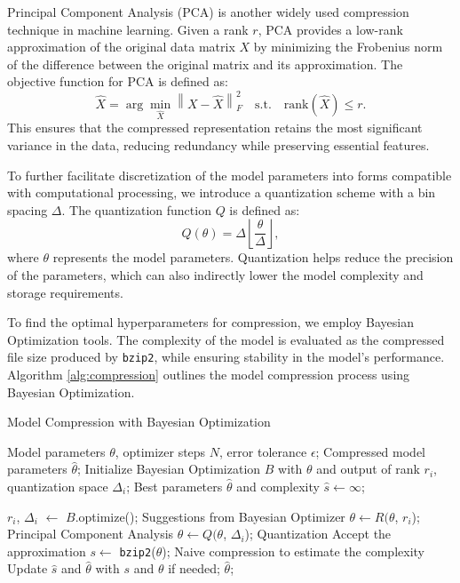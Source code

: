 \documentclass{article}
\begin{document}
Principal Component Analysis (PCA) is another widely used compression technique in machine learning. Given a rank $r$, PCA provides a low-rank approximation of the original data matrix $X$ by minimizing the Frobenius norm of the difference between the original matrix and its approximation. The objective function for PCA is defined as:
$$
\hat{X} = \arg\min_{\hat{X}} \left\| X - \hat{X} \right\|_F^2 \quad \text{s.t.} \quad \text{rank}(\hat{X}) \le r.
$$
This ensures that the compressed representation retains the most significant variance in the data, reducing redundancy while preserving essential features.

To further facilitate discretization of the model parameters into forms compatible with computational processing, we introduce a quantization scheme with a bin spacing $\Delta$. The quantization function $Q$ is defined as:
$$
Q(\theta) = \Delta \left\lfloor \frac{\theta}{\Delta} \right\rfloor,
$$
where $\theta$ represents the model parameters. Quantization helps reduce the precision of the parameters, which can also indirectly lower the model complexity and storage requirements.

To find the optimal hyperparameters for compression, we employ Bayesian Optimization tools. The complexity of the model is evaluated as the compressed file size produced by \texttt{bzip2}, while ensuring stability in the model's performance. Algorithm \ref{alg:compression} outlines the model compression process using Bayesian Optimization.

\begin{algorithm}[!ht]
    \renewcommand{\algorithmicrequire}{\textbf{Input:}}
    \renewcommand{\algorithmicensure}{\textbf{Output:}}
    \caption{Model Compression with Bayesian Optimization}
    \label{alg:compression}
    \begin{algorithmic}[1]
        \Require Model parameters $\theta$, optimizer steps $N$, error tolerance $\epsilon$;
        \Ensure Compressed model parameters $\hat{\theta}$;
        \State Initialize Bayesian Optimization $B$ with $\theta$ and output of rank $r_i$, quantization space $\Delta_i$;
        \State Best parameters $\hat{\theta}$ and complexity $\hat{s} \leftarrow \infty$;

        \State $r_i$, $\Delta_i$ $\leftarrow$ $B$.optimize();
        \Comment Suggestions from Bayesian Optimizer
        \State $\theta \leftarrow R(\theta$, $r_i$);
        \Comment Principal Component Analysis
        \State $\theta \leftarrow Q(\theta$, $\Delta_i$);
        \Comment Quantization
        \Comment Accept the approximation
        \State $s \leftarrow$ \texttt{bzip2}($\theta$);
        \Comment Naive compression to estimate the complexity
        \State Update $\hat{s}$ and $\hat{\theta}$ with $s$ and $\theta$ if needed;
        \EndIf
        \EndFor
        \State \Return $\hat{\theta}$;
    \end{algorithmic}
\end{algorithm}
\end{document}
